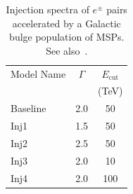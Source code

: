 \documentclass[doublespace,draft,nopageskip]{VTthesis} %
\begin{document}
\begin{table}
  \centering
    \begin{tabular}{lcc}\hline\hline
    Model Name&$\Gamma$ & $E_{\text{cut}}$\\
    & &  (TeV) \\\hline
    Baseline &2.0 & 50 \\
    Inj1&1.5 & 50 \\
    Inj2&2.5 & 50 \\
    Inj3&2.0 & 10 \\
    Inj4&2.0 & 100\\\hline\hline
    \end{tabular}
    \caption{Injection spectra of $e^{\pm}$ pairs accelerated by a Galactic bulge population of MSPs. See also~\citep{Song:2019nrx}.}
    \label{tab:mspspectrum}
\end{table}
\end{document}
